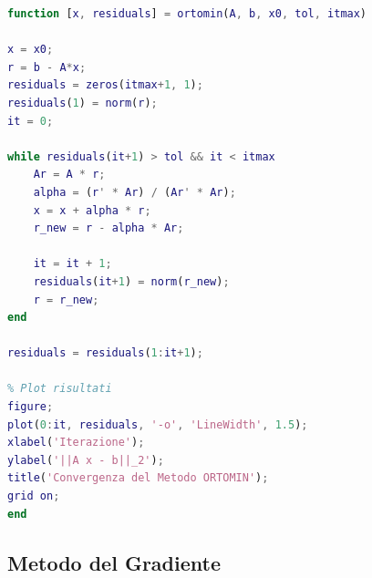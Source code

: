 \documentclass[12pt,a4paper]{article}
\begin{document}
\begin{flushleft}
\end{flushleft}

\vspace{1em}
\begin{lstlisting}[language=Matlab]
function [x, residuals] = ortomin(A, b, x0, tol, itmax)

x = x0;
r = b - A*x;
residuals = zeros(itmax+1, 1);
residuals(1) = norm(r);
it = 0;

while residuals(it+1) > tol && it < itmax
    Ar = A * r;
    alpha = (r' * Ar) / (Ar' * Ar);
    x = x + alpha * r;
    r_new = r - alpha * Ar;

    it = it + 1;
    residuals(it+1) = norm(r_new);
    r = r_new;
end

residuals = residuals(1:it+1);

% Plot risultati
figure;
plot(0:it, residuals, '-o', 'LineWidth', 1.5);
xlabel('Iterazione');
ylabel('||A x - b||_2');
title('Convergenza del Metodo ORTOMIN');
grid on;
end

\end{lstlisting}


\newpage
\subsection*{Metodo del Gradiente}
\end{document}
